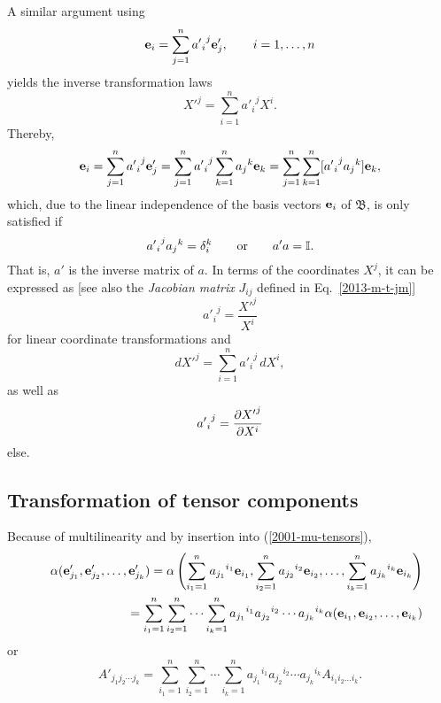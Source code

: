 A similar argument using
\begin{equation}
{\bf e}_i=\sum_{j=1}^n {{a'}_i}^j {\bf e}'_j, \qquad i=1,\ldots , n
\label{2012-m-ch-tlcbv}
\end{equation}
yields the inverse transformation laws
\begin{equation}
{X'}^j   = \sum_{i=1}^n {{a'}_i}^j{X}^i.
\end{equation}
Thereby,
\begin{equation}
{\bf e}_i=\sum_{j=1}^n {{a'}_i}^j {\bf e}'_j
=\sum_{j=1}^n {{a'}_i}^j \sum_{k=1}^n {a_j}^k {\bf e}_k
=\sum_{j=1}^n \sum_{k=1}^n [{{a'}_i}^j {a_j}^k] {\bf e}_k,
\end{equation}
which, due to the linear independence of the basis vectors ${\bf e}_i$ of ${\mathfrak B}$,
is only satisfied if
\begin{equation}
{{a'}_i}^j {a_j}^k =\delta_i^k
\qquad
{\rm or}
\qquad
a'a={\Bbb I}.
\end{equation}
That is, $a'$ is the inverse matrix of $a$.
In terms of the coordinates $X^j$, it can be expressed as
[see also the {\em Jacobian matrix}
$
J_{ij}$ defined in Eq.~\ref{2013-m-t-jm}]
\begin{equation}
{{a'}_i}^j =\frac{ {X'}^j }{   X^i}
\label{2001-mu-tensor-tl2}
\end{equation}
for linear   coordinate transformations and
\begin{equation}
d{X'}^j   = \sum_{i=1}^n {{a'}_i}^j\, d{X}^i,
\end{equation}
as well as
\begin{equation}
{{a'}_i}^j ={\partial {X'}^j \over \partial X^i}
\label{2001-mu-tensor-tl2nl}
\end{equation}
else.

\subsection{Transformation of tensor components}

Because of multilinearity  and by insertion into
(\ref{2001-mu-tensors}),
\begin{eqnarray}
&&\alpha ( {\bf e}'_{j_1},{\bf e}'_{j_2},\ldots ,{\bf e}'_{j_k})=
\alpha \left(
\sum_{i_1=1}^n {a_{j_1}}^{i_1} {\bf e}_{i_1},
\sum_{i_2=1}^n {a_{j_2}}^{i_2} {\bf e}_{i_2},
\ldots ,
\sum_{i_k=1}^n {a_{j_k}}^{i_k} {\bf e}_{i_k}
\right)
\nonumber \\&& \quad
=
\sum_{i_1=1}^n\sum_{i_2=1}^n\cdots \sum_{i_k=1}^n
{a_{j_1}}^{i_1}{a_{j_2}}^{i_2}\cdots {a_{j_k}}^{i_k} \alpha ( {\bf e}_{i_1},{\bf e}_{i_2},\ldots ,{\bf e}_{i_k})
\label{2012-m-ch-tensor-etotc1}
\end{eqnarray}
or
\begin{equation}
A'_{{j_1}{j_2}\cdots {j_k}}=
\sum_{i_1=1}^n\sum_{i_2=1}^n\cdots \sum_{i_k=1}^n
{a_{j_1}}^{i_1}{a_{j_2}}^{i_2}\cdots {a_{j_k}}^{i_k} A_{i_1 i_2\ldots i_k}.
\label{2011-m-tvtcov}
\end{equation}


